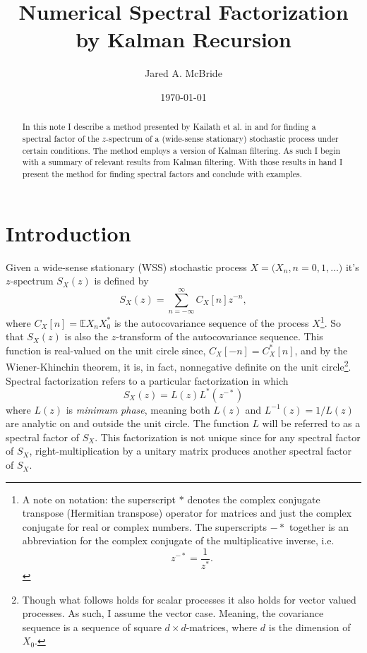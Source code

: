 \documentclass[12pt]{amsart}
\title{Numerical Spectral Factorization by Kalman Recursion}
\author{Jared A. McBride}
\date{\today}
\newcommand{\E}{\mathbb{E}}
\begin{document}
	
\begin{abstract}
	In this note I describe a method presented by Kailath et al. in \cite{sayed2001} and \cite{kailath2000} for finding a spectral factor of the $z$-spectrum of a (wide-sense stationary) stochastic process under certain conditions. The method employs a version of Kalman filtering. As such I begin with a summary of relevant results from Kalman filtering. With those results in hand I present the method for finding spectral factors and conclude with examples.
\end{abstract}

\maketitle
\tableofcontents

\section{Introduction}

Given a wide-sense stationary (WSS) stochastic process $X = \big(X_n, n = 0, 1, \dots\big)$ it's $z$-spectrum $S_X(z)$ is defined by
$$S_X(z) = \sum_{n=-\infty}^\infty C_X[n]z^{-n},$$
where $C_X[n] = \E X_nX_0^*$ is the autocovariance sequence of the process $X$\footnote{
	A note on notation: the superscript $*$ denotes the complex conjugate transpose (Hermitian transpose) operator for matrices and just the complex conjugate for real or complex numbers. The superscripts $-*$ together is an abbreviation for the complex conjugate of the multiplicative inverse, i.e. $$z^{-*} = \frac{1}{z^*}.$$
}.
So that $S_X(z)$ is also the $z$-transform of the autocovariance sequence. This function is real-valued on the unit circle since, $C_X[-n] = C_X^*[n]$, and by the Wiener-Khinchin theorem, it is, in fact, nonnegative definite on the unit circle\footnote{
	Though what follows holds for scalar processes it also holds for vector valued processes. As such, I assume the vector case. Meaning, the covariance sequence is a sequence of square $d\times d$-matrices, where $d$ is the dimension of $X_0$.}.
Spectral factorization refers to a particular factorization in which 
$$S_X(z) = L(z)L^*(z^{-*})$$
where $L(z)$ is \emph{minimum phase}, meaning both $L(z)$ and $L^{-1}(z) = 1/L(z)$ are analytic on and outside the unit circle. The function $L$ will be referred to as a spectral factor of $S_X$. This factorization is not unique since for any spectral factor of $S_X$, right-multiplication by a unitary matrix produces another spectral factor of $S_X$. 
\end{document}
